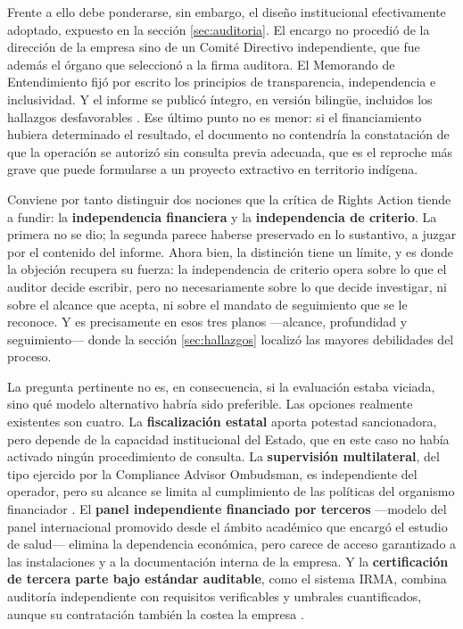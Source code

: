 Frente a ello debe ponderarse, sin embargo, el diseño institucional efectivamente
adoptado, expuesto en la sección \ref{sec:auditoria}. El encargo no procedió de la
dirección de la empresa sino de un Comité Directivo independiente, que fue además
el órgano que seleccionó a la firma auditora. El Memorando de Entendimiento fijó
por escrito los principios de transparencia, independencia e inclusividad. Y el
informe se publicó íntegro, en versión bilingüe, incluidos los hallazgos
desfavorables \parencite{oncommonground2010hria}. Ese último punto no es menor: si
el financiamiento hubiera determinado el resultado, el documento no contendría la
constatación de que la operación se autorizó sin consulta previa adecuada, que es
el reproche más grave que puede formularse a un proyecto extractivo en territorio
indígena.

Conviene por tanto distinguir dos nociones que la crítica de Rights Action tiende
a fundir: la \textbf{independencia financiera} y la \textbf{independencia de
criterio}. La primera no se dio; la segunda parece haberse preservado en lo
sustantivo, a juzgar por el contenido del informe. Ahora bien, la distinción tiene
un límite, y es donde la objeción recupera su fuerza: la independencia de criterio
opera sobre lo que el auditor decide escribir, pero no necesariamente sobre lo
que decide investigar, ni sobre el alcance que acepta, ni sobre el mandato de
seguimiento que se le reconoce. Y es precisamente en esos tres planos —alcance,
profundidad y seguimiento— donde la sección \ref{sec:hallazgos} localizó las
mayores debilidades del proceso.

La pregunta pertinente no es, en consecuencia, si la evaluación estaba viciada,
sino qué modelo alternativo habría sido preferible. Las opciones realmente
existentes son cuatro. La \textbf{fiscalización estatal} aporta potestad
sancionadora, pero depende de la capacidad institucional del Estado, que en este
caso no había activado ningún procedimiento de consulta. La \textbf{supervisión
multilateral}, del tipo ejercido por la Compliance Advisor Ombudsman, es
independiente del operador, pero su alcance se limita al cumplimiento de las
políticas del organismo financiador \parencite{cao2006marlin}. El \textbf{panel
independiente financiado por terceros} —modelo del panel internacional promovido
desde el ámbito académico que encargó el estudio de salud— elimina la dependencia
económica, pero carece de acceso garantizado a las instalaciones y a la
documentación interna de la empresa. Y la \textbf{certificación de tercera parte
bajo estándar auditable}, como el sistema IRMA, combina auditoría independiente con
requisitos verificables y umbrales cuantificados, aunque su contratación también
la costea la empresa \parencite{irmasfstandard}.

